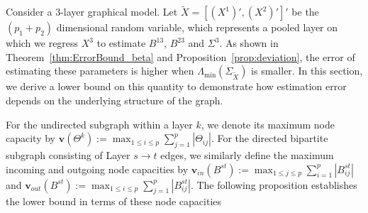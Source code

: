 Consider a $3$-layer graphical model. Let $\widetilde{X} = [(X^1)', (X^2)']'$ be the $(p_1+p_2)$ dimensional random variable, which represents a pooled layer on which we regress $X^3$ to estimate $B^{13}$, $B^{23}$ and $\Sigma^3$. As shown in Theorem~\ref{thm:ErrorBound_beta} and Proposition~\ref{prop:deviation}, the error of estimating these parameters is higher when $\Lambda_{\min}(\Sigma_{\tilde{X}})$ is smaller. In this section, we derive a lower bound on this quantity to demonstrate how estimation error depends on the underlying structure of the graph.

For the undirected subgraph within a layer $k$, we denote its maximum node capacity by $\mathbf{v}(\Theta^k):= \max_{1 \le i \le p} \sum_{j=1}^p |\Theta_{ij}|$. For the directed bipartite subgraph consisting of Layer $s \rightarrow t$ edges, we similarly define the maximum incoming and outgoing node capacities by $\mathbf{v}_{in}(B^{st}):= \max_{1 \le j \le p} \sum_{i=1}^p|B^{st}_{ij}|$ and $\mathbf{v}_{out}(B^{st}):= \max_{1 \le i \le p} \sum_{j=1}^p |B^{st}_{ij}|$. The following proposition establishes the lower bound in terms of these node capacities

